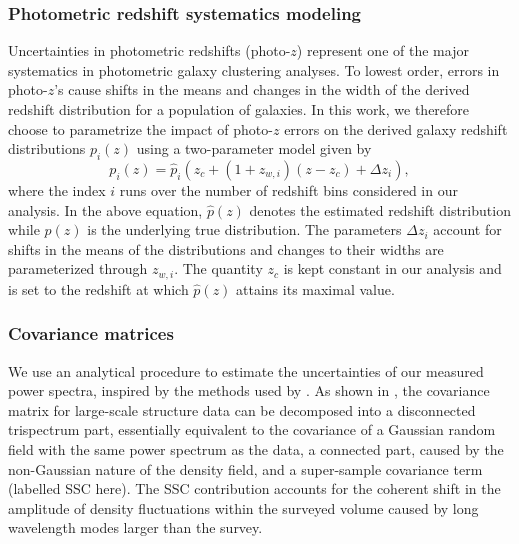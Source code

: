 \documentclass[a4paper,11pt]{article}
\begin{document}
  \subsubsection{Photometric redshift systematics modeling}\label{sssec:methods.theory.photoz_syst}
    Uncertainties in photometric redshifts (photo-$z$) represent one of the major systematics in photometric galaxy clustering analyses. To lowest order, errors in photo-$z$'s cause shifts in the means and changes in the width of the derived redshift distribution for a population of galaxies. In this work, we therefore choose to parametrize the impact of photo-$z$ errors on the derived galaxy redshift distributions $p_{i}(z)$ using a two-parameter model given by
    \begin{equation}
      p_{i}(z) = \hat{p}_{i}(z_{c} + (1 + z_{w, i})(z-z_{c}) + \Delta z_{i}),
      \label{eq:photo-z-model}
    \end{equation} 
    where the index $i$ runs over the number of redshift bins considered in our analysis. In the above equation, $\hat{p}(z)$ denotes the estimated redshift distribution while $p(z)$ is the underlying true distribution. The parameters $\Delta z_{i}$ account for shifts in the means of the distributions and changes to their widths are parameterized through $z_{w, i}$. The quantity $z_{c}$ is kept constant in our analysis and is set to the redshift at which $\hat{p}(z)$ attains its maximal value.
    
  \subsubsection{Covariance matrices}\label{sssec:methods.theory.covar}
    We use an analytical procedure to estimate the uncertainties of our measured power spectra, inspired by the methods used by \cite{Krause:2017}. As shown in \cite{2009MNRAS.395.2065T,Takada:2013}, the covariance matrix for large-scale structure data can be decomposed into a disconnected trispectrum part, essentially equivalent to the covariance of a Gaussian random field with the same power spectrum as the data, a connected part, caused by the non-Gaussian nature of the density field, and a super-sample covariance term (labelled SSC here). The SSC contribution accounts for the coherent shift in the amplitude of density fluctuations within the surveyed volume caused by long wavelength modes larger than the survey.
    
\end{document}
